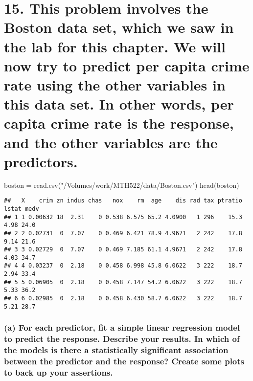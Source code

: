 \documentclass[
]{article}
\author{}
\date{\vspace{-2.5em}}
\newenvironment{Shaded}{\begin{snugshade}}{\end{snugshade}}
\newcommand{\FunctionTok}[1]{\textcolor[rgb]{0.00,0.00,0.00}{#1}}
\newcommand{\NormalTok}[1]{#1}
\newcommand{\OtherTok}[1]{\textcolor[rgb]{0.56,0.35,0.01}{#1}}
\newcommand{\StringTok}[1]{\textcolor[rgb]{0.31,0.60,0.02}{#1}}
\begin{document}
\hypertarget{this-problem-involves-the-boston-data-set-which-we-saw-in-the-lab-for-this-chapter.-we-will-now-try-to-predict-per-capita-crime-rate-using-the-other-variables-in-this-data-set.-in-other-words-per-capita-crime-rate-is-the-response-and-the-other-variables-are-the-predictors.}{%
\section{15. This problem involves the Boston data set, which we saw in
the lab for this chapter. We will now try to predict per capita crime
rate using the other variables in this data set. In other words, per
capita crime rate is the response, and the other variables are the
predictors.}\label{this-problem-involves-the-boston-data-set-which-we-saw-in-the-lab-for-this-chapter.-we-will-now-try-to-predict-per-capita-crime-rate-using-the-other-variables-in-this-data-set.-in-other-words-per-capita-crime-rate-is-the-response-and-the-other-variables-are-the-predictors.}}

\begin{Shaded}
\begin{Highlighting}[]
\NormalTok{boston }\OtherTok{=} \FunctionTok{read.csv}\NormalTok{(}\StringTok{"/Volumes/work/MTH522/data/Boston.csv"}\NormalTok{)}
\FunctionTok{head}\NormalTok{(boston)}
\end{Highlighting}
\end{Shaded}

\begin{verbatim}
##   X    crim zn indus chas   nox    rm  age    dis rad tax ptratio lstat medv
## 1 1 0.00632 18  2.31    0 0.538 6.575 65.2 4.0900   1 296    15.3  4.98 24.0
## 2 2 0.02731  0  7.07    0 0.469 6.421 78.9 4.9671   2 242    17.8  9.14 21.6
## 3 3 0.02729  0  7.07    0 0.469 7.185 61.1 4.9671   2 242    17.8  4.03 34.7
## 4 4 0.03237  0  2.18    0 0.458 6.998 45.8 6.0622   3 222    18.7  2.94 33.4
## 5 5 0.06905  0  2.18    0 0.458 7.147 54.2 6.0622   3 222    18.7  5.33 36.2
## 6 6 0.02985  0  2.18    0 0.458 6.430 58.7 6.0622   3 222    18.7  5.21 28.7
\end{verbatim}

\hypertarget{a-for-each-predictor-fit-a-simple-linear-regression-model-to-predict-the-response.-describe-your-results.-in-which-of-the-models-is-there-a-statistically-significant-association-between-the-predictor-and-the-response-create-some-plots-to-back-up-your-assertions.}{%
\subsubsection{(a) For each predictor, fit a simple linear regression
model to predict the response. Describe your results. In which of the
models is there a statistically significant association between the
predictor and the response? Create some plots to back up your
assertions.}\label{a-for-each-predictor-fit-a-simple-linear-regression-model-to-predict-the-response.-describe-your-results.-in-which-of-the-models-is-there-a-statistically-significant-association-between-the-predictor-and-the-response-create-some-plots-to-back-up-your-assertions.}}
\end{document}
